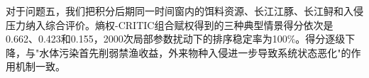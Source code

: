 对于问题五，我们把积分后期同一时间窗内的饵料资源、长江江豚、长江鲟和入侵压力纳入综合评价。熵权-CRITIC组合赋权得到的三种典型情景得分依次是0.662、0.423和0.155，2000次局部参数扰动下的排序稳定率为100\%。得分逐级下降，与"水体污染首先削弱禁渔收益，外来物种入侵进一步导致系统状态恶化"的作用机制一致。
